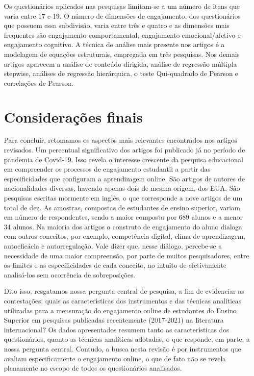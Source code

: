 \documentclass[portuguese]{textolivre}
\begin{document}
Os questionários aplicados nas pesquisas limitam-se a um número de itens que varia entre 17 e 19. O número de dimensões de engajamento, dos questionários que possuem essa subdivisão, varia entre três e quatro e as dimensões mais frequentes são engajamento comportamental, engajamento emocional/afetivo e engajamento cognitivo. A técnica de análise mais presente nos artigos é a modelagem de equações estruturais, empregada em três pesquisas. Nos demais artigos aparecem a análise de conteúdo dirigida, análise de regressão múltipla stepwise, análises de regressão hierárquica, o teste Qui-quadrado de Pearson e correlações de Pearson.

\section{Considerações finais}
Para concluir, retomamos os aspectos mais relevantes encontrados nos artigos revisados. Um percentual significativo dos artigos foi publicado já no período de pandemia de Covid-19. Isso revela o interesse crescente da pesquisa educacional em compreender os processos de engajamento estudantil a partir das especificidades que configuram a aprendizagem online. São artigos de autores de nacionalidades diversas, havendo apenas dois de mesma origem, dos EUA. São pesquisas escritas mormente em inglês, o que corresponde a nove artigos de um total de dez. As amostras, compostas de estudantes de ensino superior, variam em número de respondentes, sendo a maior composta por 689 alunos e a menor 34 alunos. Na maioria dos artigos o construto de engajamento do aluno dialoga com outros conceitos, por exemplo, competência digital, clima de aprendizagem, autoeficácia e autorregulação. Vale dizer que, nesse diálogo, percebe-se a necessidade de uma maior compreensão, por parte de muitos pesquisadores, entre os limites e as especificidades de cada conceito, no intuito de efetivamente analisá-los sem ocorrência de sobreposições.

Dito isso, resgatamos nossa pergunta central de pesquisa, a fim de evidenciar as contestações: quais as características dos instrumentos e das técnicas analíticas utilizadas para a mensuração do engajamento online de estudantes do Ensino Superior em pesquisas publicadas recentemente (2017-2021) na literatura internacional? Os dados apresentados resumem tanto as características dos questionários, quanto as técnicas analíticas adotadas, o que responde, em parte, a nossa pergunta central. Contudo, a busca nesta revisão é por instrumentos que avaliam especificamente o engajamento online, o que de fato não se revela plenamente no escopo de todos os questionários analisados.
\end{document}
